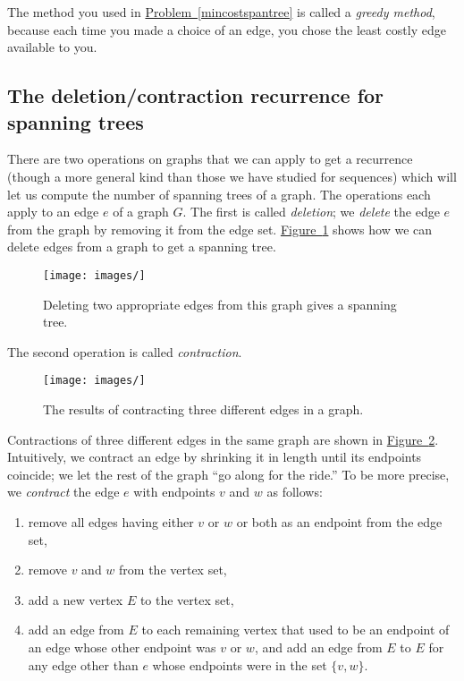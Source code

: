 \documentclass[10pt,]{book}
\theoremstyle{plain}
\theoremstyle{definition}
\numberwithin{equation}{chapter}
\begin{document}
The method you used in \hyperref[mincostspantree]{Problem~\ref{mincostspantree}} is called a \emph{greedy method}, because each time you made a choice of an edge, you chose the least costly edge available to you.%
\typeout{************************************************}
\typeout{************************************************}
\subsection[{The deletion/contraction recurrence for spanning trees}]{The deletion/contraction recurrence for spanning trees}\label{subsection-20}
There are two operations on graphs that we can apply to get a recurrence (though a more general kind than those we have studied for sequences) which will let us compute the number of spanning trees of a graph. The operations each apply to an edge \(e\) of a graph \(G\). The first is called \emph{deletion}; we \emph{delete} the edge \(e\) from the graph by removing it from the edge set. \hyperref[twodeletions]{Figure~\ref{twodeletions}} shows how we can delete edges from a graph to get a spanning tree.%
\begin{figure}
\centering
\texttt{[image: images/]}
\caption{Deleting two appropriate edges from this graph gives a spanning tree.\label{twodeletions}}
\end{figure}
The second operation is called \emph{contraction}.%
\begin{figure}
\centering
\texttt{[image: images/]}
\caption{The results of contracting three different edges in a graph.\label{threecontractions}}
\end{figure}
Contractions of three different edges in the same graph are shown in \hyperref[threecontractions]{Figure~\ref{threecontractions}}. Intuitively, we contract an edge by shrinking it in length until its endpoints coincide; we let the rest of the graph ``go along for the ride.'' To be more precise, we \emph{contract} the edge \(e\) with endpoints \(v\) and \(w\) as follows: \leavevmode%
\begin{enumerate}
\item\hypertarget{li-26}{}remove all edges having either \(v\) or \(w\) or both as an endpoint from the edge set,%
\item\hypertarget{li-27}{}remove \(v\) and \(w\) from the vertex set,%
\item\hypertarget{li-28}{}add a new vertex \(E\) to the vertex set,%
\item\hypertarget{li-29}{}add an edge from \(E\) to each remaining vertex that used to be an endpoint of an edge whose other endpoint was \(v\) or \(w\), and add an edge from \(E\) to \(E\) for any edge other than \(e\) whose endpoints were in the set \(\{v,w\}\).%
\end{enumerate}
\end{document}
